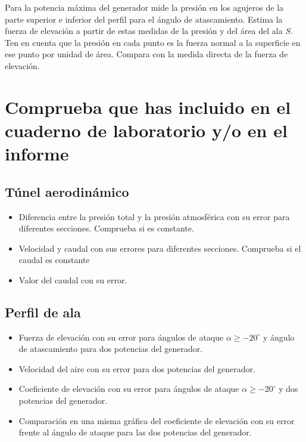 \documentclass[11pt]{articulo}
\begin{document}
Para la potencia m\'axima del generador mide la presi\'on en los agujeros de la parte superior e inferior del perfil para el \'angulo de atascamiento. Estima la fuerza de elevaci\'on a partir de estas medidas de la presi\'on y del \'area del ala $S$. Ten en cuenta que la presi\'on en cada punto es la fuerza normal a la superficie en ese punto por unidad de \'area. Compara con la medida directa de la fuerza de elevaci\'on.

\newpage
\section*{Comprueba que has incluido en el cuaderno de laboratorio y/o en el informe}

\subsection*{T\'unel aerodin\'amico}

\begin{itemize}

\item{Diferencia entre la presi\'on total y la presi\'on atmosf\'erica con su error para diferentes secciones. Comprueba si es constante.}
\item{Velocidad y caudal con sus errores para diferentes secciones. Comprueba si el caudal es constante}
\item{Valor del caudal con su error.}

\end{itemize}

\subsection*{Perfil de ala}

\begin{itemize}

\item{Fuerza de elevaci\'on con su error para \'angulos de ataque $\alpha \geq -20^{\circ}$ y \'angulo de atascamiento para dos potencias del generador.}
\item{Velocidad del aire con su error para dos potencias del generador.}
\item{Coeficiente de elevaci\'on con su error para \'angulos de ataque $\alpha \geq -20^{\circ}$ y dos potencias del generador.}
\item{Comparaci\'on en una misma gr\'afica del coeficiente de elevaci\'on con su error frente al \'angulo de ataque para las dos potencias del generador.}

\end{itemize}
\end{document}
